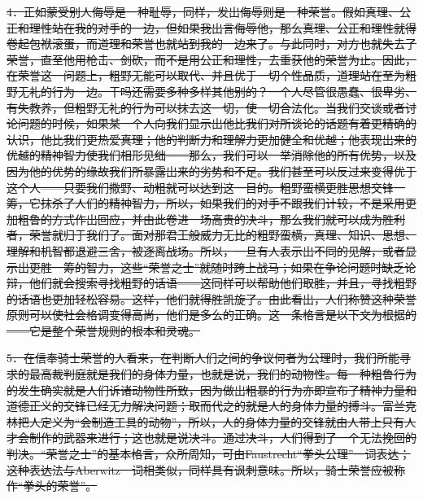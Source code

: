 \documentclass[12pt,oneside]{book}
\begin{document}
\sout{4．正如蒙受别人侮辱是一种耻辱，同样，发出侮辱则是一种荣誉。假如真理、公正和理性站在我的对手的一边，但如果我出言侮辱他，那么真理、公正和理性就得卷起包袱滚蛋，而道理和荣誉也就站到我的一边来了。与此同时，对方也就失去了荣誉，直至他用枪击、剑砍，而不是用公正和理性，去重获他的荣誉为止。因此，在荣誉这一问题上，粗野无能可以取代、并且优于一切个性品质，道理站在至为粗野无礼的行为一边。干吗还需要多种多样其他别的？一个人尽管很愚蠢、很卑劣、有失教养，但粗野无礼的行为可以抹去这一切，使一切合法化。当我们交谈或者讨论问题的时候，如果某一个人向我们显示出他比我们对所谈论的话题有着更精确的认识，他比我们更热爱真理；他的判断力和理解力更加健全和优越；他表现出来的优越的精神智力使我们相形见绌——那么，我们可以一举消除他的所有优势，以及因为他的优势的缘故我们所暴露出来的劣势和不足。我们甚至可以反过来变得优于这个人——只要我们撒野、动粗就可以达到这一目的。粗野蛮横更胜思想交锋一筹，它抹杀了人们的精神智力，所以，如果我们的对手不跟我们计较，不是采用更加粗鲁的方式作出回应，并由此卷进一场高贵的决斗，那么我们就可以成为胜利者，荣誉就归于我们了。面对那君王般威力无比的粗野蛮横，真理、知识、思想、理解和机智都退避三舍，被逐离战场。所以，一旦有人表示出不同的见解，或者显示出更胜一筹的智力，这些“荣誉之士”就随时跨上战马；如果在争论问题时缺乏论辩，他们就会搜索寻找粗野的话语——这同样可以帮助他们取胜，并且，寻找粗野的话语也更加轻松容易。这样，他们就得胜凯旋了。由此看出，人们称赞这种荣誉原则可以使社会格调变得高尚，他们是多么的正确。这一条格言是以下文为根据的——它是整个荣誉规则的根本和灵魂。 }

\sout{5．在信奉骑士荣誉的人看来，在判断人们之间的争议何者为公理时，我们所能寻求的最高裁判庭就是我们的身体力量，也就是说，我们的动物性。每一种粗鲁行为的发生确实就是人们诉诸动物性所致，因为做出粗暴的行为亦即宣布了精神力量和道德正义的交锋已经无力解决问题；取而代之的就是人的身体力量的搏斗。富兰克林把人定义为“会制造工具的动物”，所以，人的身体力量的交锋就由人带上只有人才会制作的武器来进行；这也就是说决斗。通过决斗，人们得到了一个无法挽回的判决。“荣誉之士”的基本格言，众所周知，可由Faustrecht“拳头公理”一词表达；这种表达法与Aberwitz一词相类似，同样具有讽刺意味。所以，骑士荣誉应被称作“拳头的荣誉”。 }
\end{document}
